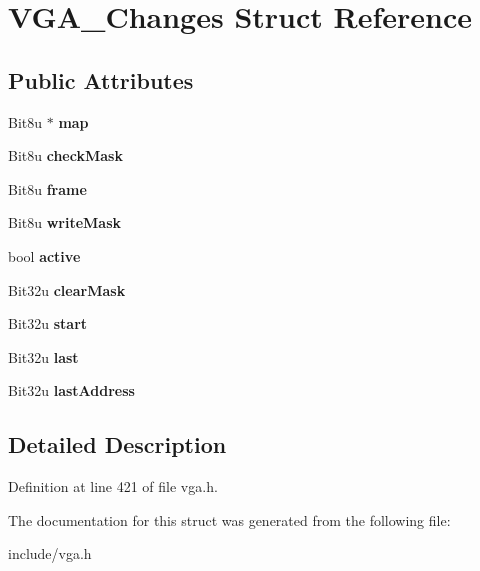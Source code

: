\hypertarget{structVGA__Changes}{\section{V\-G\-A\-\_\-\-Changes Struct Reference}
\label{structVGA__Changes}
}
\subsection*{Public Attributes}
\begin{DoxyCompactItemize}
\item 
\hypertarget{structVGA__Changes_aae6472354347c41048cfab1219789b64}{Bit8u $\ast$ {\bfseries map}}\label{structVGA__Changes_aae6472354347c41048cfab1219789b64}

\item 
\hypertarget{structVGA__Changes_a6ae67831c523b25bdc21fa4db83afe43}{Bit8u {\bfseries check\-Mask}}\label{structVGA__Changes_a6ae67831c523b25bdc21fa4db83afe43}

\item 
\hypertarget{structVGA__Changes_ac26763f63772c078c7743773f53cde98}{Bit8u {\bfseries frame}}\label{structVGA__Changes_ac26763f63772c078c7743773f53cde98}

\item 
\hypertarget{structVGA__Changes_ad700dfb8efd57be98a89c9204d4af2f7}{Bit8u {\bfseries write\-Mask}}\label{structVGA__Changes_ad700dfb8efd57be98a89c9204d4af2f7}

\item 
\hypertarget{structVGA__Changes_a5e1eb3db4e0041fcaa05d426cf0bcf7b}{bool {\bfseries active}}\label{structVGA__Changes_a5e1eb3db4e0041fcaa05d426cf0bcf7b}

\item 
\hypertarget{structVGA__Changes_a64765a10e9ca419e7fe12ad0cd73f297}{Bit32u {\bfseries clear\-Mask}}\label{structVGA__Changes_a64765a10e9ca419e7fe12ad0cd73f297}

\item 
\hypertarget{structVGA__Changes_adcb1b4110d1643ca21b047ff682124b5}{Bit32u {\bfseries start}}\label{structVGA__Changes_adcb1b4110d1643ca21b047ff682124b5}

\item 
\hypertarget{structVGA__Changes_af476a9d8e176d26e02c9297300ed8baf}{Bit32u {\bfseries last}}\label{structVGA__Changes_af476a9d8e176d26e02c9297300ed8baf}

\item 
\hypertarget{structVGA__Changes_a65c792a3ddf72b6a016b3b221857f3b7}{Bit32u {\bfseries last\-Address}}\label{structVGA__Changes_a65c792a3ddf72b6a016b3b221857f3b7}

\end{DoxyCompactItemize}


\subsection{Detailed Description}


Definition at line 421 of file vga.\-h.



The documentation for this struct was generated from the following file\-:\begin{DoxyCompactItemize}
\item 
include/vga.\-h\end{DoxyCompactItemize}
